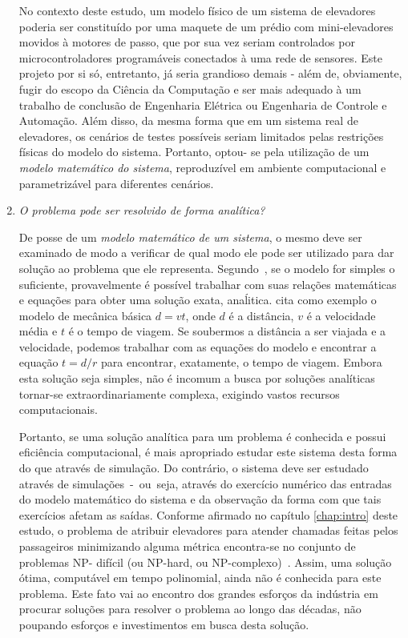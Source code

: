 \begin{enumerate}
No contexto deste estudo, um modelo físico de um sistema de elevadores poderia
ser constituído por uma maquete de um prédio com mini-elevadores movidos à
motores de passo, que por sua vez seriam controlados por microcontroladores
programáveis conectados à uma rede de sensores. Este projeto por si só,
entretanto, já seria grandioso demais - além de, obviamente, fugir do escopo da
Ciência da Computação e ser mais adequado à um trabalho de conclusão de
Engenharia Elétrica ou Engenharia de Controle e Automação. Além disso, da mesma
forma que em um sistema real de elevadores, os cenários de testes possíveis
seriam limitados pelas restrições físicas do modelo do sistema. Portanto, optou-
se pela utilização de um \textit{modelo matemático do sistema}, reproduzível em
ambiente computacional e parametrizável para diferentes cenários.

\item \textit{O problema pode ser resolvido de forma analítica?}

De posse de um \textit{modelo matemático de um sistema}, o mesmo deve ser
examinado de modo a verificar de qual modo ele pode ser utilizado para dar
solução ao problema que ele representa. Segundo~\cite{Law}, se o modelo for
simples o suficiente, provavelmente é possível trabalhar com suas relações
matemáticas e equações para obter uma solução exata, anaĺitica. \cite{Law} cita
como exemplo o modelo de mecânica básica $d = vt$, onde $d$ é a distância, $v$ é
a velocidade média e $t$ é o tempo de viagem. Se soubermos a distância a ser
viajada e a velocidade, podemos trabalhar com as equações do modelo e encontrar
a equação $t = d/r$ para encontrar, exatamente, o tempo de viagem. Embora esta
solução seja simples, não é incomum a busca por soluções analíticas tornar-se
extraordinariamente complexa, exigindo vastos recursos computacionais.

Portanto, se uma solução analítica para um problema é conhecida e possui
eficiência computacional, é mais apropriado estudar este sistema desta forma do
que através de simulação. Do contrário, o sistema deve ser estudado através de
simulações~-~ou~seja, através do exercício numérico das entradas do modelo
matemático do sistema e da observação da forma com que tais exercícios afetam as
saídas. Conforme afirmado no capítulo \ref{chap:intro} deste estudo, o problema
de atribuir elevadores para atender chamadas feitas pelos passageiros
minimizando alguma métrica encontra-se no conjunto de problemas NP- difícil (ou
NP-hard, ou NP-complexo)~\cite{SeKo99}. Assim, uma solução ótima, computável em
tempo polinomial, ainda não é conhecida para este problema. Este fato vai ao
encontro dos grandes esforços da indústria em procurar soluções para resolver o
problema ao longo das décadas, não poupando esforços e investimentos em busca
desta solução.

\end{enumerate}

